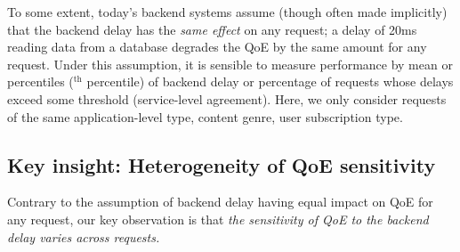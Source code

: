 To some extent, today's  backend systems assume (though often made implicitly) that the backend delay has the {\em same effect} on any request; \eg a delay of 20ms reading data from a database degrades the QoE by the same amount for any request. 
Under this assumption, it is sensible to measure performance by mean or percentiles ($^\textrm{th}$ percentile) of backend delay or percentage of requests whose delays exceed some threshold (\eg service-level agreement).
Here, we only consider requests of the same application-level type, \eg content genre, user subscription type.

\subsection{Key insight: Heterogeneity of QoE sensitivity}

Contrary to the assumption of backend delay having equal impact on QoE for any request, our key observation is that 
{\em the sensitivity of QoE to the backend delay varies across requests.}

